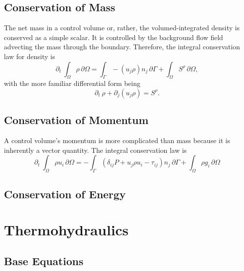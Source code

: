 \documentclass[Prelim,12pt]{WisconsinThesis}
\newcommand{\pdt}   {\partial_t\:\!}
\newcommand{\pdj}   {\partial_j}
\newcommand{\V}     {\ensuremath{\Omega}}
\newcommand{\dV}    {\,\partial\V}
\newcommand{\IntV}  {\int_{\V}}
\renewcommand{\S}   {\ensuremath{\Gamma}}
\newcommand{\dS}    {\,\partial\S}
\newcommand{\IntS}  {\int_{\S}}
\begin{document}
\subsection{Conservation of Mass}
The net mass in a control volume or, rather, the volumed-integrated density is conserved as a simple scalar.
It is controlled by the background flow field advecting the mass through the boundary.
Therefore, the integral conservation law for density is
\begin{equation}
    \pdt\!\IntV \rho \dV = \IntS -(u_j \rho)n_j\dS + \IntV S^\rho\dV,
\end{equation}
with the more familiar differential form being
\begin{equation}
    \pdt \rho + \pdj (u_j \rho) = S^\rho.
\end{equation}

\subsection{Conservation of Momentum}
A control volume's momentum is more complicated than mass because it is inherently a vector quantity.
The integral conservation law is 
\begin{equation}
    \pdt \IntV \rho u_i \dV = -\IntS (\delta_{ij} P +  u_j \rho u_i - \tau_{ij}) n_j \dS + \IntV \rho g_i \dV
\end{equation}




\subsection{Conservation of Energy}






\section{Thermohydraulics}
\subsection{Base Equations}
\end{document}
